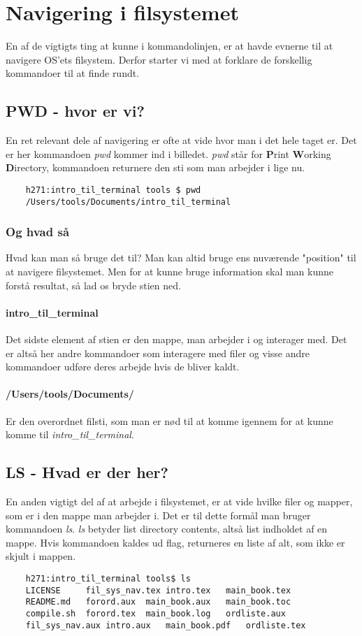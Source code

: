 \chapter{Navigering i filsystemet}
En af de vigtigts ting at kunne i kommandolinjen, er at  havde evnerne til at navigere OS'ets filsystem. Derfor starter vi med at forklare de forskellig kommandoer til at finde rundt.
\section{PWD - hvor er vi?}
En ret relevant dele af navigering er ofte at vide hvor man i det hele taget er. Det er her kommandoen \textit{pwd} kommer ind i billedet. \textit{pwd} står for \textbf{P}rint \textbf{W}orking \textbf{D}irectory, kommandoen returnere den sti som man arbejder i lige nu. 
\begin{lstlisting}
	h271:intro_til_terminal tools $ pwd
	/Users/tools/Documents/intro_til_terminal
\end{lstlisting}
\subsection*{Og hvad så}
Hvad kan man så bruge det til? Man kan altid bruge ens nuværende "position" til at navigere filsystemet. Men for at kunne bruge information skal man kunne forstå resultat, så lad os bryde stien ned. 
\subsubsection*{intro\_til\_terminal}
Det sidste element af stien er den mappe, man arbejder i og interager med. Det er altså her andre kommandoer som interagere med filer og visse andre kommandoer udføre deres arbejde hvis de bliver kaldt. %
\subsubsection*{/Users/tools/Documents/}
Er den overordnet filsti, som man er nød til at komme igennem for at kunne komme til \textit{intro\_til\_terminal}.

\section{LS - Hvad er der her?}
En anden vigtigt del af at arbejde i filsystemet, er at vide hvilke filer og mapper, som er i den mappe man arbejder i. Det er til dette formål man bruger kommandoen \textit{ls}. \textit{ls} betyder list directory contents, altså list indholdet af en mappe. Hvis kommandoen kaldes ud flag, returneres en liste af alt, som ikke er skjult i mappen.
\begin{lstlisting}
	h271:intro_til_terminal tools$ ls
	LICENSE		fil_sys_nav.tex	intro.tex	main_book.tex
	README.md	forord.aux	main_book.aux	main_book.toc
	compile.sh	forord.tex	main_book.log	ordliste.aux
	fil_sys_nav.aux	intro.aux	main_book.pdf	ordliste.tex
\end{lstlisting}
